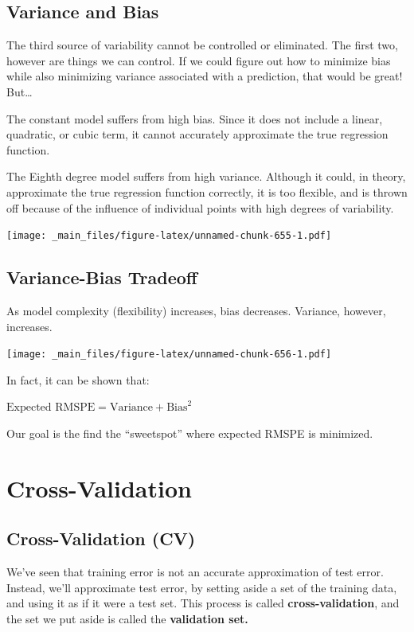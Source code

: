 \documentclass[]{book}
\begin{document}
\subsection{Variance and Bias}\label{variance-and-bias}

The third source of variability cannot be controlled or eliminated. The
first two, however are things we can control. If we could figure out how
to minimize bias while also minimizing variance associated with a
prediction, that would be great! But\ldots{}

The constant model suffers from high bias. Since it does not include a
linear, quadratic, or cubic term, it cannot accurately approximate the
true regression function.

The Eighth degree model suffers from high variance. Although it could,
in theory, approximate the true regression function correctly, it is too
flexible, and is thrown off because of the influence of individual
points with high degrees of variability.

\texttt{[image: \_main\_files/figure-latex/unnamed-chunk-655-1.pdf]}

\subsection{Variance-Bias Tradeoff}\label{variance-bias-tradeoff-1}

As model complexity (flexibility) increases, bias decreases. Variance,
however, increases.

\texttt{[image: \_main\_files/figure-latex/unnamed-chunk-656-1.pdf]}

In fact, it can be shown that:

\(\text{Expected RMSPE} = \text{Variance} + \text{Bias}^2\)

Our goal is the find the ``sweetspot'' where expected RMSPE is
minimized.

\section{Cross-Validation}\label{cross-validation}

\subsection{Cross-Validation (CV)}\label{cross-validation-cv}

We've seen that training error is not an accurate approximation of test
error. Instead, we'll approximate test error, by setting aside a set of
the training data, and using it as if it were a test set. This process
is called \textbf{cross-validation}, and the set we put aside is called
the \textbf{validation set.}
\end{document}

